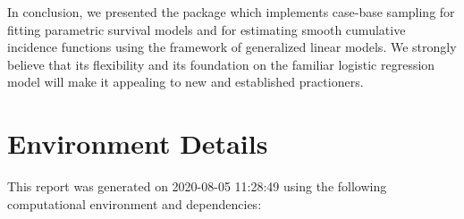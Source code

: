 \documentclass[
]{jss}
\begin{document}
In conclusion, we presented the  package 
which implements case-base sampling for fitting parametric survival
models and for estimating smooth cumulative incidence functions using
the framework of generalized linear models. We strongly believe that its
flexibility and its foundation on the familiar logistic regression model
will make it appealing to new and established practioners.

\hypertarget{environment-details}{%
\section{Environment Details}\label{environment-details}}

This report was generated on 2020-08-05 11:28:49 using the following
computational environment and dependencies:
\end{document}
